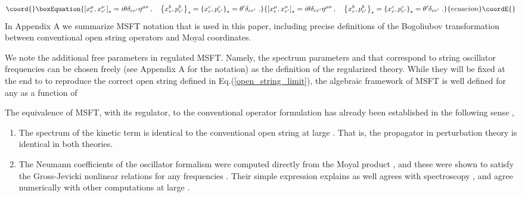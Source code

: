 \documentclass[a4paper,aps,preprint,nofootinbib,eqsecnum]{revtex4}
\begin{document}
\begin{equation}\coord{}\boxEquation{
\left[ x_{e}^{\mu },x_{e^{\prime }}^{\nu }\right] _{\star }=i\theta \delta
_{ee^{\prime }}\eta ^{\mu \nu }\,,\quad \left\{ x_{e}^{b},p_{e^{\prime
}}^{b}\right\} _{\star }=\left\{ x_{e}^{c},p_{e^{\prime }}^{c}\right\}
_{\star }={\theta ^{\prime }}\delta _{ee^{\prime }}\,\,.
\label{star_product}
}{
\left[ x_{e}^{\mu },x_{e^{\prime }}^{\nu }\right] _{\star }=i\theta \delta
_{ee^{\prime }}\eta ^{\mu \nu }\,,\quad \left\{ x_{e}^{b},p_{e^{\prime
}}^{b}\right\} _{\star }=\left\{ x_{e}^{c},p_{e^{\prime }}^{c}\right\}
_{\star }={\theta ^{\prime }}\delta _{ee^{\prime }}\,\,.
}{ecuacion}\coordE{}\end{equation}%
In Appendix A we summarize MSFT notation that is used in this paper,
including precise definitions of the Bogoliubov transformation between
conventional open string operators and Moyal coordinates.

We note the additional free parameters in regulated MSFT. Namely, the
spectrum parameters \coordHE{} and \coordHE{} that correspond to
string oscillator frequencies can be chosen freely (see Appendix A for the
notation) as the definition of the regularized theory. While they will be
fixed at the end to \coordHE{} to reproduce the correct open string
defined in Eq.(\ref{open_string_limit}), the algebraic framework of MSFT is
well defined for any \coordHE{} as a function of \coordHE{}

The equivalence of MSFT, with its regulator, to the conventional operator
formulation has already been established in the following sense
\cite{BKM1},

\begin{enumerate}
\item The spectrum of the kinetic term is identical to the conventional open
string at large \coordHE{}. That is, the propagator in perturbation theory is
identical in both theories.

\item The Neumann coefficients of the oscillator formalism were computed
directly from the Moyal product \cite{BM2}\cite{PREP}, and these were shown
to satisfy the Gross-Jevicki nonlinear relations \cite{GJ} for any
frequencies \coordHE{}. Their simple expression explains as well agrees
with spectroscopy \cite{spectroscopy}, and agree numerically with other
computations at large \coordHE{}.
\end{enumerate}
\end{document}
